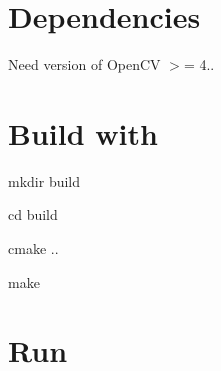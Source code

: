 \section*{Dependencies}

Need version of Open\+CV $>$= 4..

\section*{Build with}


\begin{DoxyItemize}
\item {\ttfamily mkdir build}
\item {\ttfamily cd build}
\item {\ttfamily cmake ..}
\item {\ttfamily make}
\end{DoxyItemize}

\section*{Run}


\begin{DoxyCode}{0}
\DoxyCodeLine{}
\DoxyCodeLine{}
\end{DoxyCode}
 